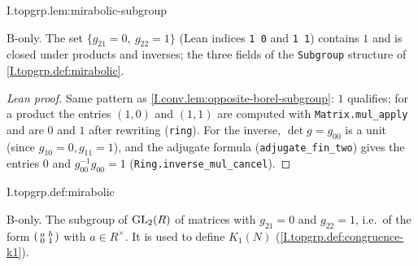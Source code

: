 \begin{lemma}
\bonly
{}
\end{lemma}
\begin{tfformal}{I.topgrp.lem:mirabolic-subgroup}
\begin{tffidelity}
B-only. The set $\{g_{21}=0,\ g_{22}=1\}$ (Lean indices \texttt{1 0} and \texttt{1 1}) contains $1$ and is closed under products and inverses; the three fields of the \texttt{Subgroup} structure of \cref{I.topgrp.def:mirabolic}.
\end{tffidelity}
\end{tfformal}
\begin{proof}[Lean proof]
Same pattern as \cref{I.conv.lem:opposite-borel-subgroup}: $1$ qualifies; for a product the entries $(1,0)$ and $(1,1)$ are computed with \texttt{Matrix.mul\_apply} and are $0$ and $1$ after rewriting (\texttt{ring}). For the inverse, $\det g=g_{00}$ is a unit (since $g_{10}=0,g_{11}=1$), and the adjugate formula (\texttt{adjugate\_fin\_two}) gives the entries $0$ and $g_{00}^{-1}g_{00}=1$ (\texttt{Ring.inverse\_mul\_cancel}).
\end{proof}

\begin{definition}
\bonly
{}
\end{definition}
\begin{tfformal}{I.topgrp.def:mirabolic}
\begin{tffidelity}
B-only. The subgroup of $\mathrm{GL}_2(R)$ of matrices with $g_{21}=0$ and $g_{22}=1$, i.e.\ of the form $\begin{psmallmatrix}a&b\\0&1\end{psmallmatrix}$ with $a\in R^\times$. It is used to define $K_1(N)$ (\cref{I.topgrp.def:congruence-k1}).
\end{tffidelity}
\end{tfformal}

